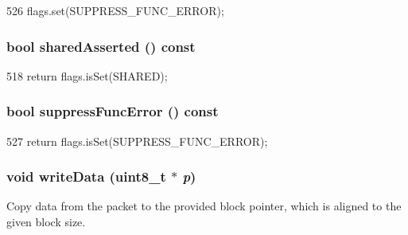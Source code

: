 \begin{DoxyCode}
526 { flags.set(SUPPRESS_FUNC_ERROR); }
\end{DoxyCode}
\hypertarget{classPacket_a298938bfa2613955b13f630ce2b591e4}{
\subsubsection[{sharedAsserted}]{\setlength{\rightskip}{0pt plus 5cm}bool sharedAsserted () const}}
\label{classPacket_a298938bfa2613955b13f630ce2b591e4}



\begin{DoxyCode}
518 { return flags.isSet(SHARED); }
\end{DoxyCode}
\hypertarget{classPacket_a181cb46d55a9f0f933fe649c6937d037}{
\subsubsection[{suppressFuncError}]{\setlength{\rightskip}{0pt plus 5cm}bool suppressFuncError () const}}
\label{classPacket_a181cb46d55a9f0f933fe649c6937d037}



\begin{DoxyCode}
527 { return flags.isSet(SUPPRESS_FUNC_ERROR); }
\end{DoxyCode}
\hypertarget{classPacket_a2388a13bab41142d6e403b0e5a0fb649}{
\subsubsection[{writeData}]{\setlength{\rightskip}{0pt plus 5cm}void writeData (uint8\_\-t $\ast$ {\em p})}}
\label{classPacket_a2388a13bab41142d6e403b0e5a0fb649}
Copy data from the packet to the provided block pointer, which is aligned to the given block size. 


